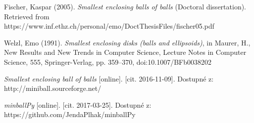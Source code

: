 \begin{thebibliography}{10}

Fischer, Kaspar (2005).
\textit{Smallest enclosing balls of balls} (Doctoral dissertation).
Retrieved from https://www.inf.ethz.ch/personal/emo/DoctThesisFiles/fischer05.pdf

Welzl, Emo (1991). \textit{Smallest enclosing disks (balls and ellipsoids)},
in Maurer, H., New Results and New Trends in Computer Science, Lecture Notes in Computer Science,
555, Springer-Verlag, pp. 359–370, doi:10.1007/BFb0038202

\textit{Smallest enclosing ball of balls} [online]. [cit. 2016-11-09]. Dostupné z: http://miniball.sourceforge.net/

\textit{minballPy} [online]. [cit. 2017-03-25]. Dostupné z: https://github.com/JendaPlhak/minballPy

\end{thebibliography}

\cleardoublepage
